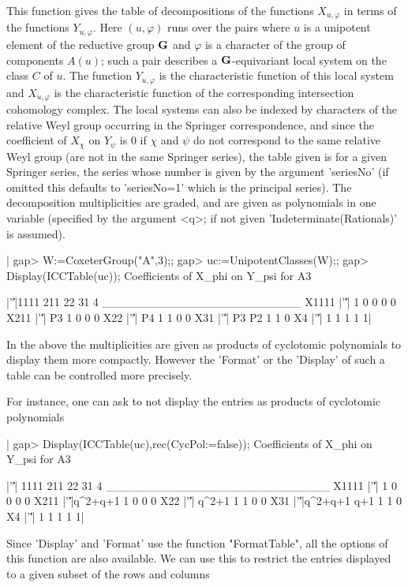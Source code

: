 This  function  gives  the  table  of  decompositions  of  the  functions $
X_{u,\varphi}$   in   terms   of   the   functions   $Y_{u,\varphi}$.  Here
$(u,\varphi)$  runs over the pairs where $u$  is a unipotent element of the
reductive  group  ${\bf G}$  and  $\varphi$  is  a  character  of  the group of
components  $A(u)$; such a pair  describes a ${\bf G}$-equivariant local system
on the class $C$ of $u$. The function $Y_{u,\varphi}$ is the characteristic
function  of this  local system  and $X_{u,\varphi}$  is the characteristic
function  of the  corresponding intersection  cohomology complex. The local
systems  can  also  be  indexed  by  characters  of the relative Weyl group
occurring  in  the  Springer  correspondence,  and since the coefficient of
$X_\chi$  on $Y_\psi$ is $0$ if $\chi$  and $\psi$ do not correspond to the
same  relative Weyl group (are not in  the same Springer series), the table
given  is for a given Springer series,  the series whose number is given by
the  argument 'seriesNo' (if omitted this defaults to 'seriesNo=1' which is
the principal series). The decomposition multiplicities are graded, and are
given as polynomials in one variable (specified by the argument <q>; if not
given 'Indeterminate(Rationals)' is assumed).

|    gap> W:=CoxeterGroup("A",3);;
    gap> uc:=UnipotentClasses(W);;
    gap> Display(ICCTable(uc));
    Coefficients of X_phi on Y_psi for A3

          |'\|'|1111 211 22 31 4
    ________________________
    X1111 |'\|'|   1   0  0  0 0
    X211  |'\|'|  P3   1  0  0 0
    X22   |'\|'|  P4   1  1  0 0
    X31   |'\|'|  P3  P2  1  1 0
    X4    |'\|'|   1   1  1  1 1|

In  the  above  the  multiplicities  are  given  as  products of cyclotomic
polynomials  to display  them more  compactly. However  the 'Format' or the
'Display'   of  such  a  table  can   be  controlled  more  precisely.

For  instance,  one  can  ask  to  not  display  the entries as products of
cyclotomic polynomials\:

|    gap> Display(ICCTable(uc),rec(CycPol:=false));
    Coefficients of X_phi on Y_psi for A3

          |'\|'|   1111 211 22 31 4
    ___________________________
    X1111 |'\|'|      1   0  0  0 0
    X211  |'\|'|q^2+q+1   1  0  0 0
    X22   |'\|'|  q^2+1   1  1  0 0
    X31   |'\|'|q^2+q+1 q+1  1  1 0
    X4    |'\|'|      1   1  1  1 1|

Since  'Display'  and  'Format'  use  the  function  "FormatTable", all the
options  of this function are  also available. We can  use this to restrict
the entries displayed to a given subset of the rows and columns\:

